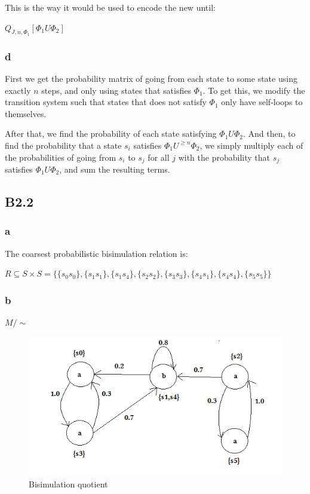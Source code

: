 This is the way it would be used to encode the new until:

$Q_{J, n, \Phi_1} [\Phi_1 U \Phi_2]$

\subsubsection{d}

First we get the probability matrix of going from each state to
some state using exactly $n$ steps,
and only using states that satisfies $\Phi_1$.
To get this, we modify the transition system such that states that does not satisfy
$\Phi_1$ only have self-loops to themselves.

After that, we find the probability of each state satisfying $\Phi_1 U \Phi_2$.
And then, to find the probability that a state $s_i$ satisfies $\Phi_1 U^{\geq n} \Phi_2$,
we simply multiply each of the probabilities of going from $s_i$ to $s_j$ for all $j$ with
the probability that $s_j$ satisfies $\Phi_1 U \Phi_2$, and sum the resulting terms.

\subsection{B2.2}

\subsubsection{a}

The coarsest probabilistic bisimulation relation is:

$R \subseteq S \times S = \{\{s_0s_0\}, \{s_1s_1\}, \{s_1s_4\}, \{s_2s_2\}, \{s_3s_3\}, \{s_4s_1\}, \{s_4s_4\}, \{s_5s_5\}\}$

\subsubsection{b}

$M/\sim$

\begin{figure}[!htb]
\centering
\includegraphics{images/bisimulation}
\caption{Bisimulation quotient}
\end{figure}

